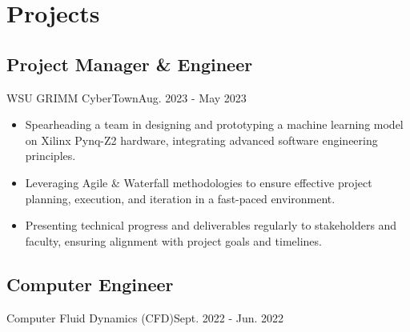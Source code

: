 \section{Projects}
\subsection{Project Manager \& Engineer}{WSU GRIMM CyberTown}{Aug. 2023 - May 2023}
\begin{itemize}
    \item Spearheading a team in designing and prototyping a machine learning model on Xilinx Pynq-Z2 hardware, integrating advanced software engineering principles.
    \item Leveraging Agile \& Waterfall methodologies to ensure effective project planning, execution, and iteration in a fast-paced environment.
    \item Presenting technical progress and deliverables regularly to stakeholders and faculty, ensuring alignment with project goals and timelines.
\end{itemize}
\subsection{Computer Engineer}{Computer Fluid Dynamics (CFD)}{Sept. 2022 - Jun. 2022}